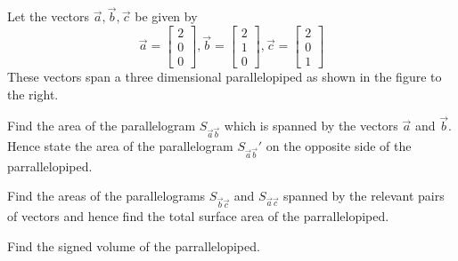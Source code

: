 \documentclass[12pt,a4paper]{article}
\begin{document}
Let the vectors $\vec{a},\vec{b},\vec{c}$ be given by
\begin{equation*}
\vec{a}=\left[ \begin{array}{c} 2 \\ 0 \\ 0 \end{array}\right],
\vec{b}=\left[ \begin{array}{c} 2 \\ 1 \\ 0 \end{array}\right],
\vec{c}=\left[ \begin{array}{c} 2 \\ 0 \\ 1 \end{array}\right]
\end{equation*}
These vectors span a three dimensional parallelopiped as shown in the figure to the right.

\begin{enumerate}
	\renewcommand{\theenumi}{\roman{enumi})}
	\renewcommand{\labelenumi}{\theenumi}
	{\setlength\itemindent{3em} \item
		Find the area of the parallelogram $S_{\vec{a}\vec{b}}$ which is spanned by the vectors $\vec{a}$ and $\vec{b}$. Hence state the area of the parallelogram $S_{\vec{a}\vec{b}}'$ on the opposite side of the parrallelopiped.}
	{\setlength\itemindent{3em} \item
		Find the areas of the parallelograms $S_{\vec{b}\vec{c}}$ and $S_{\vec{a}\vec{c}}$ spanned by the relevant pairs of vectors and hence find the total surface area of the parrallelopiped.}
	{\setlength\itemindent{3em} \item
		Find the signed volume of the parrallelopiped.}
\end{enumerate}
\end{document}
